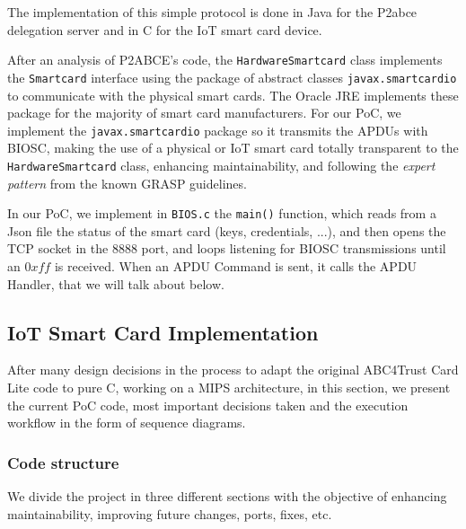 \documentclass[journal]{IEEEtran}
\begin{document}
\hfil


The implementation of this simple protocol is done in Java for the P2abce delegation server and in C for the IoT smart card device.



\hfil

After an analysis of P2ABCE's code, the \texttt{HardwareSmartcard} class implements the \texttt{Smartcard} interface using the package of abstract classes \texttt{javax.smartcardio} to communicate with the physical smart cards. The Oracle JRE implements these package for the majority of smart card manufacturers. For our PoC, we implement the \texttt{javax.smartcardio} package so it transmits the APDUs with BIOSC, making the use of a physical or IoT smart card totally transparent to the \texttt{HardwareSmartcard} class, enhancing maintainability, and following the \textit{expert pattern} from the known GRASP guidelines.


\hfil


In our PoC, we implement in \texttt{BIOS.c} the \texttt{main()} function, which reads from a Json file the status of the smart card (keys, credentials, ...), and then opens the TCP socket in the $8888$ port, and loops listening for BIOSC transmissions until an $0xff$ is received. When an APDU Command is sent, it calls the APDU Handler, that we will talk about below.




\subsection{IoT Smart Card Implementation}


After many design decisions in the process to adapt the original ABC4Trust Card Lite code to pure C, working on a MIPS architecture, in this section, we present the current PoC code, most important decisions taken and the execution workflow in the form of sequence diagrams.


\hfil



\subsubsection{Code structure}


We divide the project in three different sections with the objective of enhancing maintainability, improving future changes, ports, fixes, etc.
\end{document}
